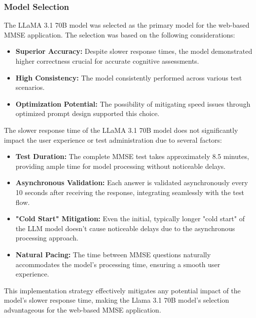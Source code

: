 \subsubsection{Model Selection}
The LLaMA 3.1 70B model was selected as the primary model for the web-based MMSE application. The selection was based on the following considerations:

\begin{itemize}
    \item \textbf{Superior Accuracy:} Despite slower response times, the model demonstrated higher correctness crucial for accurate cognitive assessments.
    
    \item \textbf{High Consistency:} The model consistently performed across various test scenarios.
    
    \item \textbf{Optimization Potential:} The possibility of mitigating speed issues through optimized prompt design supported this choice.
\end{itemize}

The slower response time of the LLaMA 3.1 70B model does not significantly impact the user experience or test administration due to several factors:

\begin{itemize}
    \item \textbf{Test Duration:} The complete MMSE test takes approximately 8.5 minutes, providing ample time for model processing without noticeable delays.
    
    \item \textbf{Asynchronous Validation:} Each answer is validated asynchronously every 10 seconds after receiving the response, integrating seamlessly with the test flow.
    
    \item \textbf{"Cold Start" Mitigation:} Even the initial, typically longer "cold start" of the LLM model doesn't cause noticeable delays due to the asynchronous processing approach.
    
    \item \textbf{Natural Pacing:} The time between MMSE questions naturally accommodates the model's processing time, ensuring a smooth user experience.
\end{itemize}

This implementation strategy effectively mitigates any potential impact of the model's slower response time, making the Llama 3.1 70B model's selection advantageous for the web-based MMSE application.

